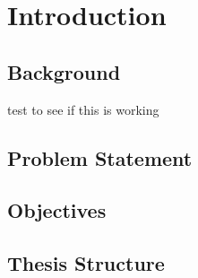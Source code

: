 
\chapter{Introduction}
\section{Background}
\lipsum[1]

test to see if this is working


\section{Problem Statement}
\lipsum[2]
\section{Objectives}
\lipsum[3]
\section{Thesis Structure}
\lipsum[4]